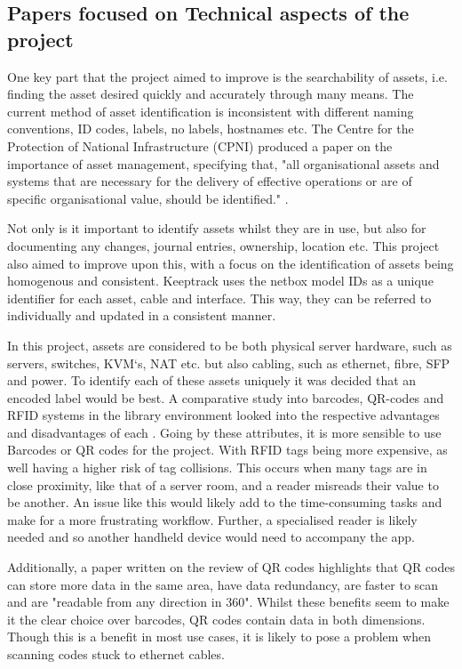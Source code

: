 \documentclass [11pt,a4paper]{article}
\begin{document}
\subsection{Papers focused on Technical aspects of the project}
\label{sec:technical}

One key part that the project aimed to improve is the searchability of assets, i.e. finding the asset desired quickly and accurately through many means. The current method of asset identification is inconsistent with different naming conventions, ID codes, labels, no labels, hostnames etc. The Centre for the Protection of National Infrastructure (CPNI) produced a paper on the importance of asset management, specifying that, "all organisational assets and systems that are necessary for the delivery of effective operations or are of specific organisational value, should be identified." \cite{cpni}.

Not only is it important to identify assets whilst they are in use, but also for documenting any changes, journal entries, ownership, location etc. This project also aimed to improve upon this, with a focus on the identification of assets being homogenous and consistent. Keeptrack uses the netbox model IDs as a unique identifier for each asset, cable and interface. This way, they can be referred to individually and updated in a consistent manner. 

In this project, assets are considered to be both physical server hardware, such as servers, switches, KVM`s, NAT etc. but also cabling, such as ethernet, fibre, SFP and power. To identify each of these assets uniquely it was decided that an encoded label would be best. A comparative study into barcodes, QR-codes and RFID systems in the library environment looked into the respective advantages and disadvantages of each \cite{lotlikar2013comparative}. Going by these attributes, it is more sensible to use Barcodes or QR codes for the project. With RFID tags being more expensive, as well having a higher risk of tag collisions. This occurs when many tags are in close proximity\cite{lotlikar2013comparative}, like that of a server room, and a reader misreads their value to be another. An issue like this would likely add to the time-consuming tasks and make for a more frustrating workflow. Further, a specialised reader is likely needed and so another handheld device would need to accompany the app.

Additionally, a paper written on the review of QR codes highlights that QR codes can store more data in the same area, have data redundancy, are faster to scan and are "readable from any direction in 360\degree"\cite{mishra2017review}. Whilst these benefits seem to make it the clear choice over barcodes, QR codes contain data in both dimensions. Though this is a benefit in most use cases, it is likely to pose a problem when scanning codes stuck to ethernet cables.
\end{document}
